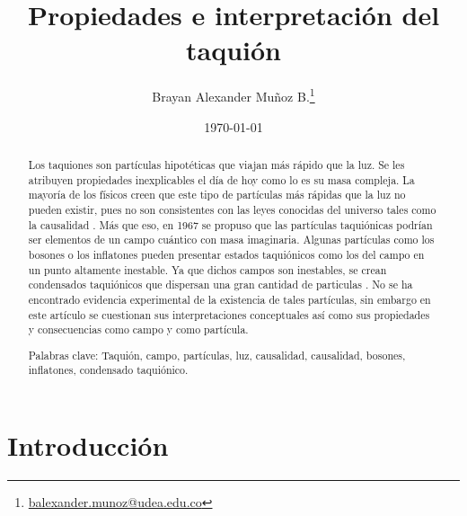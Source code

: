 \documentclass[twocolumn,preprintnumbers,amsmath,amssymb]{revtex4}
\begin{document}
\title{Propiedades e interpretación del taquión}
\author{Brayan Alexander Muñoz B.\footnote{\href{mailto:restrepo@udea.edu.co}{balexander.munoz@udea.edu.co}}}


\date{\today}

\begin{abstract}

Los taquiones son partículas hipotéticas que viajan más rápido que la luz. Se les atribuyen propiedades inexplicables el día de hoy como lo es su masa compleja. La mayoría de los físicos creen que este tipo de partículas más rápidas que la luz no pueden existir, pues no son consistentes con las leyes conocidas del universo tales como la causalidad  \cite{Randall:900484}. Más que eso, en 1967 se propuso que las partículas taquiónicas podrían ser elementos de un campo cuántico con masa imaginaria. Algunas partículas como los bosones o los inflatones pueden presentar estados taquiónicos como los del campo en un punto altamente inestable. Ya que dichos campos son inestables, se crean condensados taquiónicos que dispersan una gran cantidad de particulas \cite{eberly2013review}. No se ha encontrado evidencia experimental de la existencia de tales partículas, sin embargo en este artículo se cuestionan sus interpretaciones conceptuales así como sus propiedades y consecuencias como campo y como partícula.

\bigskip	
\noindent
Palabras clave: Taquión, campo, partículas, luz, causalidad, causalidad, bosones, inflatones, condensado taquiónico.

\end{abstract}

\maketitle

\section{Introducción}
\end{document}
